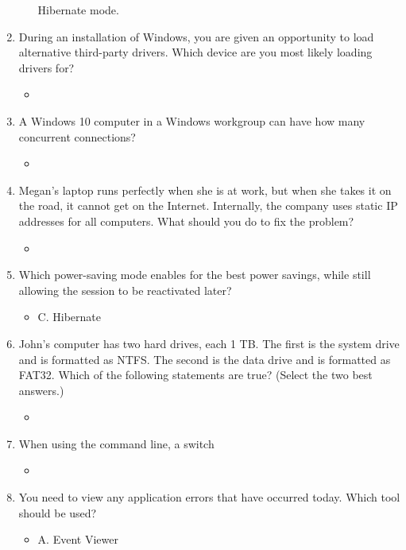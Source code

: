 \documentclass{article}
\begin{document}
\begin{enumerate}
\begin{itemize}
Hibernate mode.
    \end{itemize}
    \item During an installation of Windows, you are given an opportunity
to load alternative third-party drivers. Which device are you most
likely loading drivers for?
    \begin{itemize}
        \item 
    \end{itemize}
    \item A Windows 10 computer in a Windows workgroup can have how
many concurrent connections?
    \begin{itemize}
        \item 
    \end{itemize}
    \item Megan’s laptop runs perfectly when she is at work, but when she
takes it on the road, it cannot get on the Internet. Internally, the
company uses static IP addresses for all computers. What should
you do to fix the problem?
    \begin{itemize}
        \item 
    \end{itemize}
    \item Which power-saving mode enables for the best power savings,
while still allowing the session to be reactivated later?
    \begin{itemize}
        \item C. Hibernate
    \end{itemize}
    \item John’s computer has two hard drives, each 1 TB. The first is the
system drive and is formatted as NTFS. The second is the data
drive and is formatted as FAT32. Which of the following statements
are true? (Select the two best answers.)
    \begin{itemize}
        \item 
    \end{itemize}
    \item When using the command line, a switch
    \begin{itemize}
        \item 
    \end{itemize}
    \item You need to view any application errors that have occurred today.
Which tool should be used?
    \begin{itemize}
        \item A. Event Viewer
    \end{itemize}

\end{enumerate}
\end{document}

